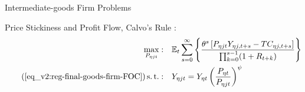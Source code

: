 \documentclass[../quali_slides.tex]{subfiles}
\begin{document}
\begin{comment}
	
	\begin{alignat}{2}
		TC_{\eta jt} & = \frac{Y_{\eta jt}}{Z_{A\eta t}} \left( \frac{R_{t}}{{\alpha_{\eta}}} \right)^{{\alpha_{\eta}}} \left( \frac{W_{\eta t}}{1-\alpha_{\eta}} \right)^{1-\alpha_{\eta}} \label{eq_v2:reg-int-good-firm-TC}
	\end{alignat}
	
	
	
	
	
	
\end{comment}


\begin{frame}{Intermediate-goods Firm Problems}
	
	Price Stickiness and Profit Flow, Calvo's Rule \cite{calvo_staggered_1983}:
\begin{align}
	\label{eq_v2:reg-int-good-firm-optimal-price-problem}
	\max_{P_{\eta jt}}: & \quad \E \sum_{s=0}^{\infty} \left\{ \frac{ \theta^s \left[ P_{\eta jt} Y_{\eta j,t+s} - TC_{\eta j,t+s} \right]}{\prod_{k=0}^{s-1}(1+R_{t+k})} \right\} \\
	\tag{\ref{eq_v2:reg-final-goods-firm-FOC}}
	\st: & \quad Y_{\eta jt} = Y_{\eta t} \left( \frac{P_{\eta t}}{P_{\eta jt}} \right)^{\psi}
\end{align}
	
\end{frame}

\end{document}
